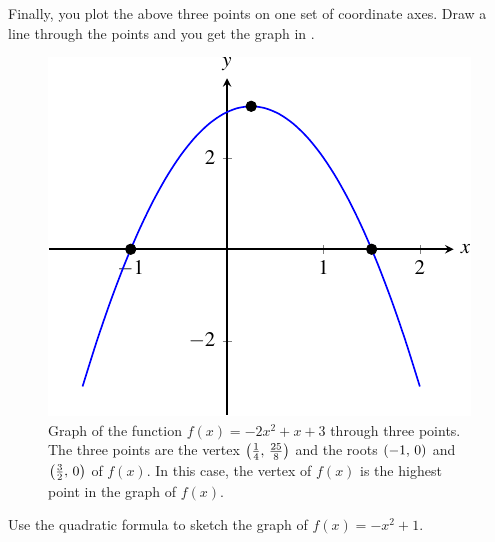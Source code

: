 \documentclass[a4paper,oneside,12pt]{article}
\begin{document}
{\begin{solution}
Finally, you plot the above three points on one set of coordinate
axes.  Draw a line through the points and you get the graph in
.

\begin{figure}[!htbp]
\centering
\includegraphics[scale=1]{image/08/aminus2-b1-c3.pdf}
\caption{%
  Graph of the function $f(x) = -2x^2 + x + 3$ through three points.
  The three points are the vertex $\left\lparen{\frac{1}{4}},\, {\frac{25}{8}}\right\rparen$
  and the roots $\left\lparen{-1},\, {0}\right\rparen$ and $\left\lparen{\frac{3}{2}},\, {0}\right\rparen$ of
  $f(x)$.  In this case, the vertex of $f(x)$ is the highest point in
  the graph of $f(x)$.
}
\label{fig:aminus2_b1_c3}
\end{figure}
\end{solution}
}{}

\begin{exercise}
Use the quadratic formula to sketch the graph of $f(x) = -x^2 + 1$.
\end{exercise}
\end{document}

